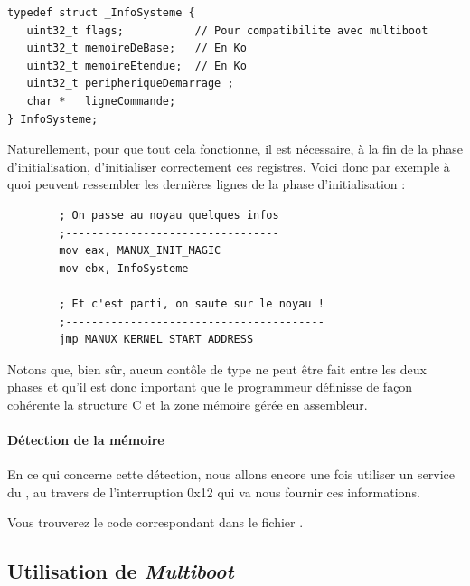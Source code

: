 \lstset{language=C}
\begin{lstlisting}
typedef struct _InfoSysteme {
   uint32_t flags;           // Pour compatibilite avec multiboot
   uint32_t memoireDeBase;   // En Ko
   uint32_t memoireEtendue;  // En Ko
   uint32_t peripheriqueDemarrage ;
   char *   ligneCommande;
} InfoSysteme;
\end{lstlisting}

   Naturellement, pour que tout cela fonctionne, il est nécessaire, à la fin
de la phase d'initialisation, d'initialiser correctement ces
registres. Voici donc par exemple à quoi peuvent ressembler les
dernières lignes de la phase d'initialisation :

\lstset{language=nasm}

\begin{lstlisting}
        ; On passe au noyau quelques infos
        ;---------------------------------
        mov eax, MANUX_INIT_MAGIC
        mov ebx, InfoSysteme

        ; Et c'est parti, on saute sur le noyau !
        ;----------------------------------------
        jmp MANUX_KERNEL_START_ADDRESS  
\end{lstlisting}

   Notons que, bien sûr, aucun contôle de type ne peut être fait entre les deux
phases et qu'il est donc important que le programmeur définisse de façon
cohérente la structure C et la zone mémoire gérée en assembleur.

\paragraph{Détection de la mémoire}

   En ce qui concerne cette détection, nous allons encore une fois
utiliser un service du \bios, au travers de l'interruption 0x12 qui va
nous fournir ces informations.

   Vous trouverez le code correspondant dans le fichier
. 


%
\subsection{Utilisation de {\em Multiboot}}

